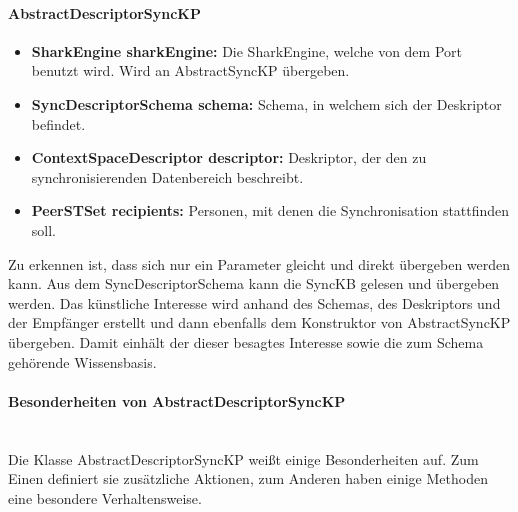 \documentclass[a4paper]{article}
\begin{document}
	\paragraph{AbstractDescriptorSyncKP}
	
	\begin{itemize}
		\item \textbf{SharkEngine sharkEngine:} Die SharkEngine, welche von
		dem Port benutzt wird. Wird an AbstractSyncKP übergeben.
		\item \textbf{SyncDescriptorSchema schema:} Schema, in welchem sich der
		Deskriptor befindet.
		\item \textbf{ContextSpaceDescriptor descriptor:} Deskriptor, der den
		zu synchronisierenden Datenbereich beschreibt.
		\item \textbf{PeerSTSet recipients:} Personen, mit denen die 
		Synchronisation stattfinden soll.
	\end{itemize}
	
	Zu erkennen ist, dass sich nur ein Parameter gleicht und direkt übergeben 
	werden kann. Aus dem SyncDescriptorSchema kann die SyncKB gelesen und
	übergeben werden. Das künstliche Interesse wird anhand des Schemas, des
	Deskriptors und der Empfänger erstellt und dann ebenfalls dem Konstruktor von
	AbstractSyncKP übergeben. Damit einhält der dieser besagtes Interesse sowie
	die zum Schema gehörende Wissensbasis.
	
	\paragraph{Besonderheiten von AbstractDescriptorSyncKP}\mbox{} \\
	
	Die Klasse AbstractDescriptorSyncKP weißt einige Besonderheiten auf. Zum
	Einen definiert sie zusätzliche Aktionen, zum Anderen haben einige Methoden
	eine besondere Verhaltensweise.
	
\end{document}
